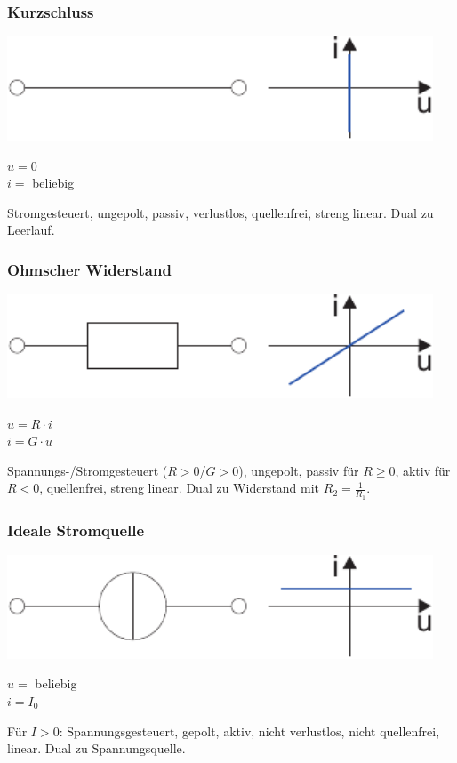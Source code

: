 \documentclass[a4paper,twocolumn,10pt]{article}
\begin{document}
\subsubsection*{Kurzschluss}
\begin{minipage}[b]{0.26\textwidth}
\includegraphics[width=0.95\textwidth]{img/Kurzschluss}
\end{minipage}
\hfill
\begin{minipage}[b]{0.2\textwidth}
$u=0$\\
$i=$ beliebig
\end{minipage}
Stromgesteuert, ungepolt, passiv, verlustlos, quellenfrei, streng linear. Dual zu Leerlauf.

\subsubsection*{Ohmscher Widerstand}
\begin{minipage}[b]{0.26\textwidth}
\includegraphics[width=0.95\textwidth]{img/Widerstand}
\end{minipage}
\hfill
\begin{minipage}[b]{0.2\textwidth}
$u=R\cdot i$\\
$i=G\cdot u$
\end{minipage}
Spannungs-/Stromgesteuert ($R>0$/$G>0$), ungepolt, passiv für $R\ge 0$, aktiv für $R<0$, quellenfrei, streng linear. Dual zu Widerstand mit $R_2=\frac{1}{R_1}$.

\subsubsection*{Ideale Stromquelle}
\begin{minipage}[b]{0.26\textwidth}
\includegraphics[width=0.95\textwidth]{img/Stromquelle}
\end{minipage}
\hfill
\begin{minipage}[b]{0.2\textwidth}
$u=$ beliebig\\
$i=I_0$
\end{minipage}
Für $I>0$: Spannungsgesteuert, gepolt, aktiv, nicht verlustlos, nicht quellenfrei, linear. Dual zu Spannungsquelle.
\end{document}

